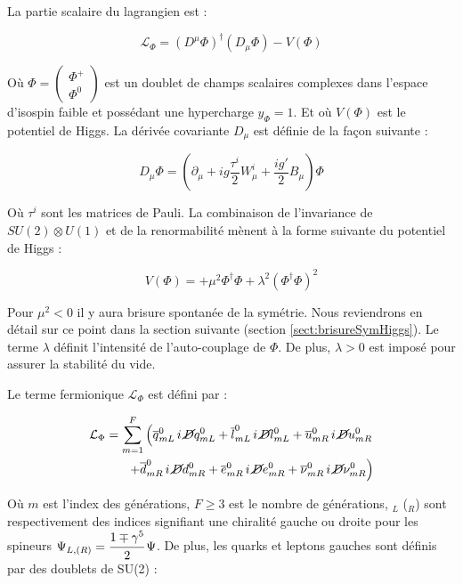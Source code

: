   La partie scalaire du lagrangien est :
  
  \begin{equation}
   \mathcal{L}_{\Phi} = (D^{\mu}\Phi)^{\dagger}(D_{\mu}\Phi) - V(\Phi)
  \end{equation}

  O\`u 
  $
  \Phi = 
  \begin{pmatrix}
   \Phi^+ \\
   \Phi^0
  \end{pmatrix} 
  $  
  est un doublet de champs scalaires complexes dans l'espace d'isospin faible et poss\'edant une hypercharge $y_{\Phi} = 1$. Et o\`u $V(\Phi)$ est le potentiel de Higgs. La d\'eriv\'ee covariante $ D_{\mu}$ est d\'efinie de la fa\c{c}on suivante : 
  
  \begin{equation}
   D_{\mu}\Phi = \left( \partial_{\mu} + i g \dfrac{\tau^i}{2} W^i_{\mu} + \dfrac{ig'}{2} B_{\mu} \right) \Phi
  \end{equation}

  O\`u $\tau^i$ sont les matrices de Pauli. La combinaison de l'invariance de $SU(2) \otimes U(1)$ et de la renormabilit\'e m\`enent \`a la forme suivante du potentiel de Higgs : 
  
  \begin{equation}
   V(\Phi) = + \mu^2 \Phi^{\dagger} \Phi + \lambda^2 (\Phi^{\dagger} \Phi)^2 
  \end{equation}

  Pour $\mu^2<0$ il y aura brisure spontan\'ee de la sym\'etrie. Nous reviendrons en d\'etail sur ce point dans la section suivante (section \ref{sect:brisureSymHiggs}). Le terme $\lambda$ définit l'intensit\'e de l'auto-couplage de $\Phi$. De plus, $\lambda > 0$ est impos\'e pour assurer la stabilit\'e du vide.
  
  Le terme fermionique $\mathcal{L}_{\Phi}$ est d\'efini par :
  
  \begin{eqnarray}
   \mathcal{L}_{\Phi} = \sum_{m=1}^F \left(  \overline{q}^0_{mL} \, i \, \cancel{D} q^0_{mL} + \overline{l}^0_{mL} \, i \, \cancel{D} l^0_{mL} + \overline{u}^0_{mR} \, i \, \cancel{D} u^0_{mR} \right. \\ \nonumber
   \left. + \overline{d}^0_{mR} \, i \, \cancel{D} d^0_{mR} + \overline{e}^0_{mR} \, i \, \cancel{D} e^0_{mR} +\overline{\nu}^0_{mR} \, i \, \cancel{D} \nu^0_{mR} \right)
  \end{eqnarray}

  O\`u $m$ est l'index des g\'en\'erations, $F \geq 3$ est le nombre de g\'en\'erations, $_L$ ($_R$) sont respectivement des indices signifiant une chiralit\'e gauche ou droite pour les spineurs $\Psi_{L,(R)} = \cfrac{1\mp \gamma^5}{2} \, \Psi$. De plus, les quarks et leptons gauches sont d\'efinis par des doublets de SU(2) : 
  
